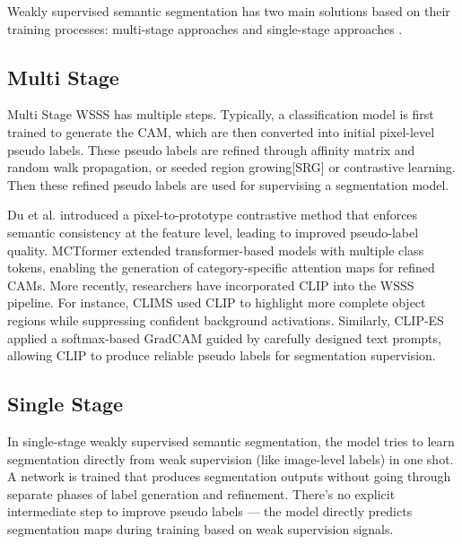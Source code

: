 Weakly supervised semantic segmentation has two main solutions based on their training processes: multi-stage approaches \cite{instance_wsss,wsss_L2G,wsss_rib} and single-stage approaches \cite{wsss_reliability_does_matter, wsss_afa_affinity_from_attention}.

\subsection{Multi Stage}
\label{subsec:multi-stage}

Multi Stage WSSS has multiple steps. Typically, a classification model is first trained to generate the CAM,  which are then converted into initial pixel-level pseudo labels. These pseudo labels are refined through affinity matrix and random walk propagation\cite{wsss_affinitynet, wsss_afa_affinity_from_attention}, or seeded region growing[SRG] or contrastive learning. Then these refined pseudo labels are used for supervising a segmentation model.

Du et al. \cite{pixel_to_prototype} introduced a pixel-to-prototype contrastive method that enforces semantic consistency at the feature level, leading to improved pseudo-label quality. MCTformer \cite{wsss_MCTformer} extended transformer-based models with multiple class tokens, enabling the generation of category-specific attention maps for refined CAMs. More recently, researchers have incorporated CLIP into the WSSS pipeline. For instance, CLIMS \cite{wsss_clims} used CLIP to highlight more complete object regions while suppressing confident background activations. Similarly, CLIP-ES \cite{wsss_clip_es} applied a softmax-based GradCAM \cite{cam_grad} guided by carefully designed text prompts, allowing CLIP to produce reliable pseudo labels for segmentation supervision.

\subsection{Single Stage}
\label{subsec:single-stage}

In single-stage weakly supervised semantic segmentation, the model tries to learn segmentation directly from weak supervision (like image-level labels) in one shot. A network is trained that produces segmentation outputs without going through separate phases of label generation and refinement. There's no explicit intermediate step to improve pseudo labels — the model directly predicts segmentation maps during training based on weak supervision signals.

